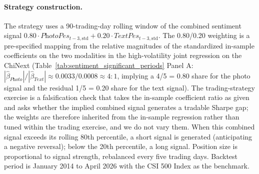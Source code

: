 \documentclass[AER]{AEA}
\begin{document}
\paragraph{Strategy construction.} The strategy uses a 90-trading-day rolling window of the combined sentiment signal $0.80 \cdot \textit{PhotoPes}_{t-3,\text{std}} + 0.20 \cdot \textit{TextPes}_{t-3,\text{std}}$. The 0.80/0.20 weighting is a pre-specified mapping from the relative magnitudes of the standardized in-sample coefficients on the two modalities in the high-volatility joint regression on the ChiNext (Table~\ref{tab:sentiment_significant_periods} Panel A: $|\hat\beta_{\textit{Photo}}| / |\hat\beta_{\textit{Text}}| \approx 0.0033 / 0.0008 \approx 4{:}1$, implying a 4/5 = 0.80 share for the photo signal and the residual 1/5 = 0.20 share for the text signal). The trading-strategy exercise is a falsification check that takes the in-sample coefficient ratio as given and asks whether the implied combined signal generates a tradable Sharpe gap; the weights are therefore inherited from the in-sample regression rather than tuned within the trading exercise, and we do not vary them. When this combined signal exceeds its rolling 80th percentile, a short signal is generated (anticipating a negative reversal); below the 20th percentile, a long signal. Position size is proportional to signal strength, rebalanced every five trading days. Backtest period is January 2014 to April 2026 with the CSI 500 Index as the benchmark.
\end{document}

